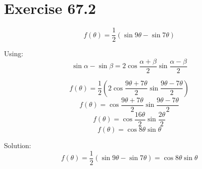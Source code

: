 \documentclass[a4paper, 10pt]{scrartcl}
\begin{document}
\section{Exercise 67.2}

\[f(\theta) = \frac{1}{2}(\sin{9\theta} - \sin{7\theta})\]

Using:
\[\sin{\alpha} - \sin{\beta} = 2\cos{\frac{\alpha + \beta}{2}}\sin{\frac{\alpha - \beta}{2}}\]

\[f(\theta) = \frac{1}{2}(2\cos{\frac{9\theta + 7\theta}{2}}\sin{\frac{9\theta - 7\theta}{2}})\]
\[f(\theta) = \cos{\frac{9\theta + 7\theta}{2}}\sin{\frac{9\theta - 7\theta}{2}}\]
\[f(\theta) = \cos{\frac{16\theta}{2}}\sin{\frac{2\theta}{2}}\]
\[f(\theta) = \cos{8\theta}\sin{\theta}\]

Solution:
\[f(\theta) = \frac{1}{2}(\sin{9\theta} - \sin{7\theta}) = \cos{8\theta}\sin{\theta}\]
\end{document}
